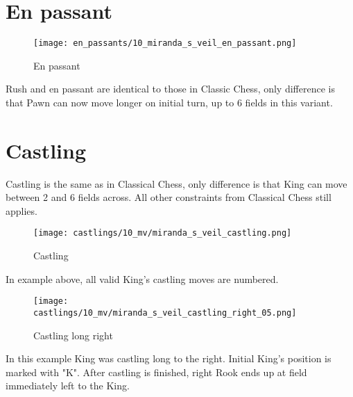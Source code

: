 \clearpage %

\section*{En passant}

\noindent
\begin{wrapfigure}{l}{0.4\textwidth}
\centering
\texttt{[image: en\_passants/10\_miranda\_s\_veil\_en\_passant.png]}
\caption{En passant}
\label{fig:10_miranda_s_veil_en_passant}
\end{wrapfigure}
Rush and en passant are identical to those in Classic Chess, only difference
is that Pawn can now move longer on initial turn, up to 6 fields in this
variant.

\clearpage %

\section*{Castling}

Castling is the same as in Classical Chess, only difference is that King can move between 2 and 6 fields across.
All other constraints from Classical Chess still applies.

\noindent
\begin{figure}[!h]
\texttt{[image: castlings/10\_mv/miranda\_s\_veil\_castling.png]}
\caption{Castling}
\label{fig:miranda_s_veil_castling}
\end{figure}

In example above, all valid King's castling moves are numbered.

\noindent
\begin{figure}[!h]
\texttt{[image: castlings/10\_mv/miranda\_s\_veil\_castling\_right\_05.png]}
\caption{Castling long right}
\label{fig:miranda_s_veil_castling_right_05}
\end{figure}

In this example King was castling long to the right. Initial King's position is marked with "K".
After castling is finished, right Rook ends up at field immediately left to the King.

